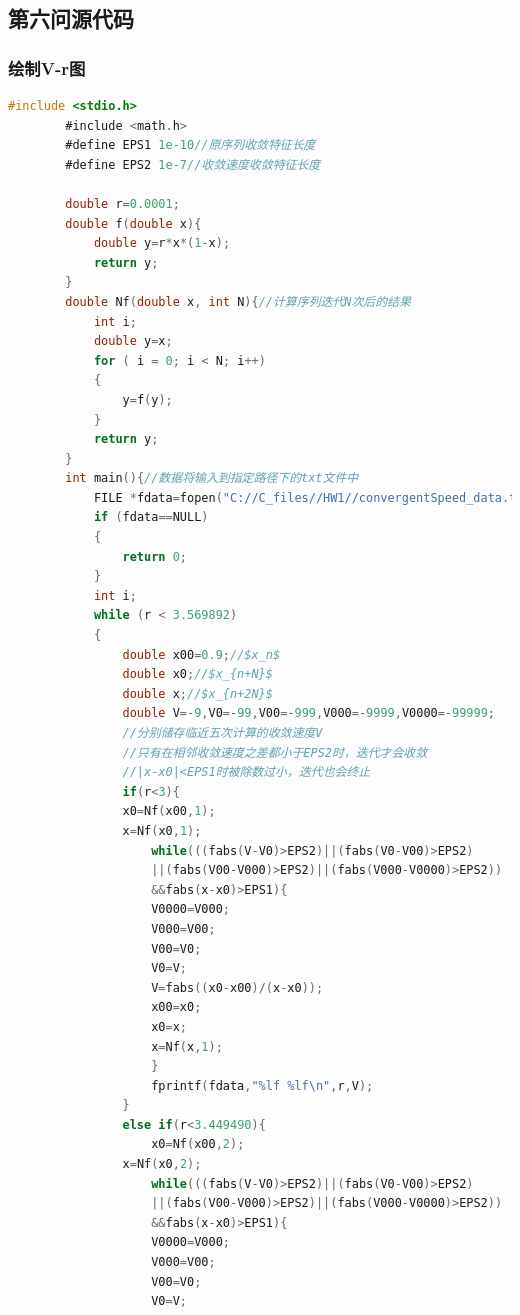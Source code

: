 \documentclass[10pt, a4paper]{article}
\begin{document}
    \subsection{第六问源代码}
    \subsubsection{绘制V-r图}
    \begin{lstlisting}[language=C]
        #include <stdio.h>
        #include <math.h>
        #define EPS1 1e-10//原序列收敛特征长度
        #define EPS2 1e-7//收敛速度收敛特征长度

        double r=0.0001;
        double f(double x){
            double y=r*x*(1-x);
            return y;
        }
        double Nf(double x, int N){//计算序列迭代N次后的结果
            int i;
            double y=x;
            for ( i = 0; i < N; i++)
            {
                y=f(y);
            }
            return y;
        }
        int main(){//数据将输入到指定路径下的txt文件中
            FILE *fdata=fopen("C://C_files//HW1//convergentSpeed_data.txt","w");
            if (fdata==NULL)
            {
                return 0;
            }
            int i;
            while (r < 3.569892)
            {
                double x00=0.9;//$x_n$
                double x0;//$x_{n+N}$
                double x;//$x_{n+2N}$
                double V=-9,V0=-99,V00=-999,V000=-9999,V0000=-99999;
                //分别储存临近五次计算的收敛速度V
                //只有在相邻收敛速度之差都小于EPS2时，迭代才会收敛
                //|x-x0|<EPS1时被除数过小，迭代也会终止
                if(r<3){
                x0=Nf(x00,1);
                x=Nf(x0,1);
                    while(((fabs(V-V0)>EPS2)||(fabs(V0-V00)>EPS2)
                    ||(fabs(V00-V000)>EPS2)||(fabs(V000-V0000)>EPS2))
                    &&fabs(x-x0)>EPS1){
                    V0000=V000;
                    V000=V00;
                    V00=V0;
                    V0=V;
                    V=fabs((x0-x00)/(x-x0));
                    x00=x0;
                    x0=x;
                    x=Nf(x,1);
                    }
                    fprintf(fdata,"%lf %lf\n",r,V); 
                }
                else if(r<3.449490){
                    x0=Nf(x00,2);
                x=Nf(x0,2);
                    while(((fabs(V-V0)>EPS2)||(fabs(V0-V00)>EPS2)
                    ||(fabs(V00-V000)>EPS2)||(fabs(V000-V0000)>EPS2))
                    &&fabs(x-x0)>EPS1){
                    V0000=V000;
                    V000=V00;
                    V00=V0;
                    V0=V;

\end{lstlisting}
\end{document}
